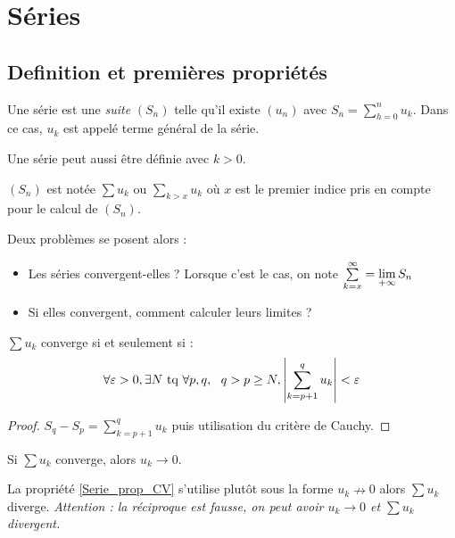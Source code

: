 \chapter{Séries}
\section{Definition et premières propriétés}

\begin{defi}
Une série est une \emph{suite} $(S_n)$ telle qu'il existe $(u_n)$ avec $S_n = \sum\limits_{h=0}^{n}u_k$. Dans ce cas, $u_k$ est appelé terme général de la série.
\end{defi}
\begin{rem}
	Une série peut aussi être définie avec $k>0$.
\end{rem}
\begin{nota}
	$(S_n)$ est notée $\sum u_k$ ou $\sum\limits_{k>x} u_k$ où $x$ est le premier indice pris en compte pour le calcul de $(S_n)$.
\end{nota}

Deux problèmes se posent alors :
\begin{itemize}
	\item Les séries convergent-elles ? Lorsque c'est le cas, on note $\sum\limits_{k=x}^{\infty} = \lim\limits_{+\infty}S_n$
	\item Si elles convergent, comment calculer leurs limites ?
\end{itemize}

\begin{prop}
$\sum u_k$ converge si et seulement si :
$$\forall\varepsilon>0,\exists N\text{~tq~}\forall p,q,~~q>p\geq N, \left|\sum\limits_{k=p+1}^q u_k\right| <\varepsilon$$
\end{prop}

\begin{proof}
$S_q-S_p = \sum\limits_{k=p+1}^q u_k$ puis utilisation du critère de Cauchy.
\end{proof}

\begin{prop} \label{Serie_prop_CV}
Si $\sum u_k$ converge, alors $u_k\to0$.
\end{prop}

\begin{rem}
La propriété \ref{Serie_prop_CV} s'utilise plutôt sous la forme $u_k\nrightarrow0$ alors $\sum u_k$ diverge. \emph{Attention : la réciproque est fausse, on peut avoir $u_k\to0$ et $\sum u_k$ divergent.}
\end{rem}

